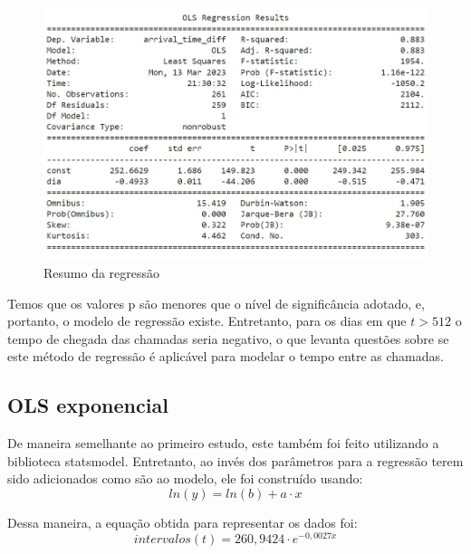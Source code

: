 \begin{figure}[H]
    \includegraphics[scale = 0.85]{analise-de-dados/regressao/OLS_summary.jpg}
    \caption{Resumo da regressão}
    \label{fig: sum_OLS}
\end{figure}

Temos que os valores p são menores que o nível de significância adotado, e, portanto, o modelo de regressão existe. Entretanto, para os dias em que $t > 512$ o tempo de chegada das chamadas seria negativo, o que levanta questões sobre se este método de regressão é aplicável para modelar o tempo entre as chamadas.

\subsection{OLS exponencial}

De maneira semelhante ao primeiro estudo, este também foi feito utilizando a biblioteca statsmodel. Entretanto, ao invés dos parâmetros para a regressão terem sido adicionados como são ao modelo, ele foi construído usando: $$ln(y) = ln(b) + a \cdot x$$

Dessa maneira, a equação obtida para representar os dados foi:
$$intervalos(t) = 260,9424 \cdot e^{-0,0027x} $$


